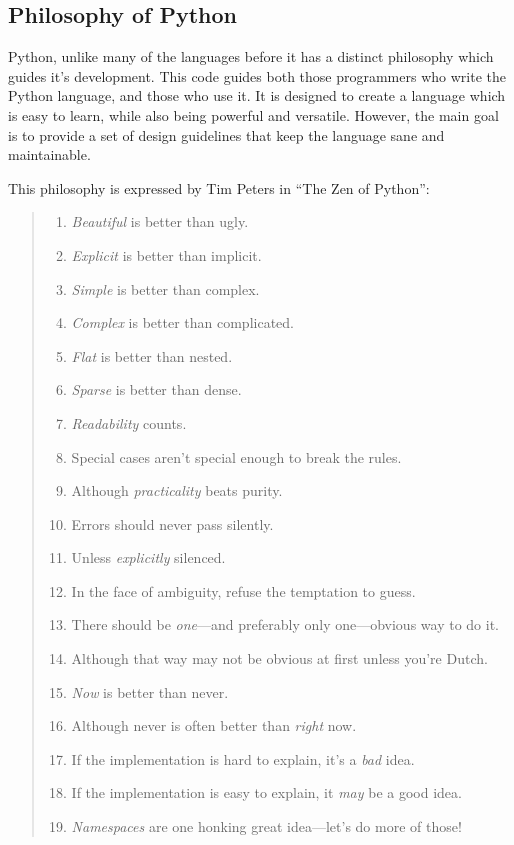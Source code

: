 		\subsection{Philosophy of Python}
			Python, unlike many of the languages before it has a distinct philosophy which guides it's development.
			This code guides both those programmers who write the Python language, and those who use it.
			It is designed to create a language which is easy to learn, while also being powerful and versatile.
			However, the main goal is to provide a set of design guidelines that keep the language sane and maintainable.

			This philosophy is expressed by Tim Peters in ``The Zen of Python''\cite{ZenOfPython}:
			\begin{quote}
				\begin{enumerate}
					\item \emph{Beautiful} is better than ugly.
					\item \emph{Explicit} is better than implicit.
					\item \emph{Simple} is better than complex.
					\item \emph{Complex} is better than complicated.
					\item \emph{Flat} is better than nested.
					\item \emph{Sparse} is better than dense.
					\item \emph{Readability} counts.
					\item Special cases aren't special enough to break the rules.
					\item Although \emph{practicality} beats purity.
					\item Errors should never pass silently.
					\item Unless \emph{explicitly} silenced.
					\item In the face of ambiguity, refuse the temptation to guess.
					\item There should be \emph{one}---and preferably only one---obvious way to do it.
					\item Although that way may not be obvious at first unless you're Dutch.
					\item \emph{Now} is better than never.
					\item Although never is often better than \emph{right} now.
					\item If the implementation is hard to explain, it's a \emph{bad} idea.
					\item If the implementation is easy to explain, it \emph{may} be a good idea.
					\item \emph{Namespaces} are one honking great idea---let's do more of those!
				\end{enumerate}
			\end{quote}
